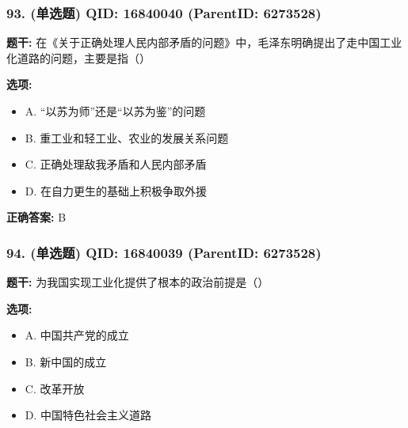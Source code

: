 \documentclass[12pt,UTF8]{ctexart}
\begin{document}
\vspace{0.3em}\hrulefill\vspace{0.7em}

\subsubsection*{93. (单选题) \small QID: 16840040 (ParentID: 6273528)}

\textbf{题干:}
在《关于正确处理人民内部矛盾的问题》中，毛泽东明确提出了走中国工业化道路的问题，主要是指（）



\textbf{选项:}
\begin{itemize}[leftmargin=*]

  \item A. “以苏为师”还是“以苏为鉴”的问题

  \item B. 重工业和轻工业、农业的发展关系问题

  \item C. 正确处理敌我矛盾和人民内部矛盾

  \item D. 在自力更生的基础上积极争取外援

\end{itemize}

\textbf{正确答案:}
B

\vspace{0.3em}\hrulefill\vspace{0.7em}

\subsubsection*{94. (单选题) \small QID: 16840039 (ParentID: 6273528)}

\textbf{题干:}
为我国实现工业化提供了根本的政治前提是（）



\textbf{选项:}
\begin{itemize}[leftmargin=*]

  \item A. 中国共产党的成立

  \item B. 新中国的成立

  \item C. 改革开放

  \item D. 中国特色社会主义道路

\end{itemize}
\end{document}
